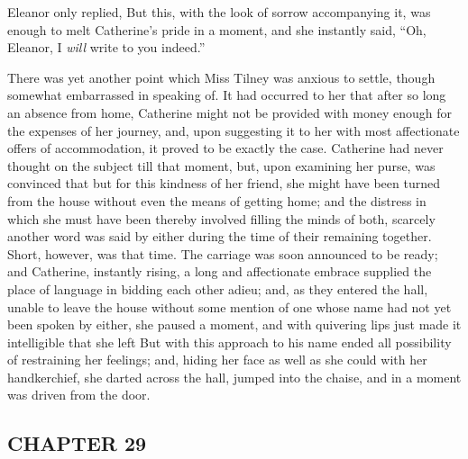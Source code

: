 
Eleanor only replied,  But this, with the look of sorrow accompanying it, was enough to melt Catherine's pride in a moment, and she instantly said, “Oh, Eleanor, I {\em will} write to you indeed.”

There was yet another point which Miss Tilney was anxious to settle, though somewhat embarrassed in speaking of. It had occurred to her that after so long an absence from home, Catherine might not be provided with money enough for the expenses of her journey, and, upon suggesting it to her with most affectionate offers of accommodation, it proved to be exactly the case. Catherine had never thought on the subject till that moment, but, upon examining her purse, was convinced that but for this kindness of her friend, she might have been turned from the house without even the means of getting home; and the distress in which she must have been thereby involved filling the minds of both, scarcely another word was said by either during the time of their remaining together. Short, however, was that time. The carriage was soon announced to be ready; and Catherine, instantly rising, a long and affectionate embrace supplied the place of language in bidding each other adieu; and, as they entered the hall, unable to leave the house without some mention of one whose name had not yet been spoken by either, she paused a moment, and with quivering lips just made it intelligible that she left  But with this approach to his name ended all possibility of restraining her feelings; and, hiding her face as well as she could with her handkerchief, she darted across the hall, jumped into the chaise, and in a moment was driven from the door.

\subsection[chapter-29]{\useURL[url31][][][]\from[url31]CHAPTER 29}

